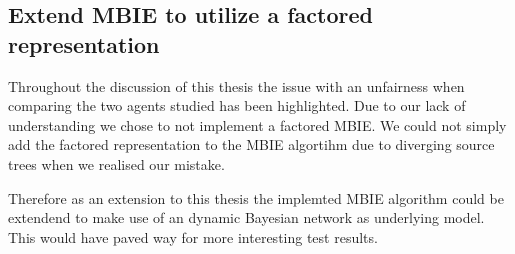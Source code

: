 \subsection{Extend MBIE to utilize a factored representation}
\label{sec:factored_mbie}

Throughout the discussion of this thesis the issue with an unfairness when
comparing the two agents studied has been highlighted. Due to our lack of
understanding we chose to not implement a factored MBIE. We could not simply
add the factored representation to the MBIE algortihm due to diverging source
trees when we realised our mistake.

Therefore as an extension to this thesis the implemted MBIE algorithm could be
extendend to make use of an dynamic Bayesian network as underlying model. This
would have paved way for more interesting test results.
